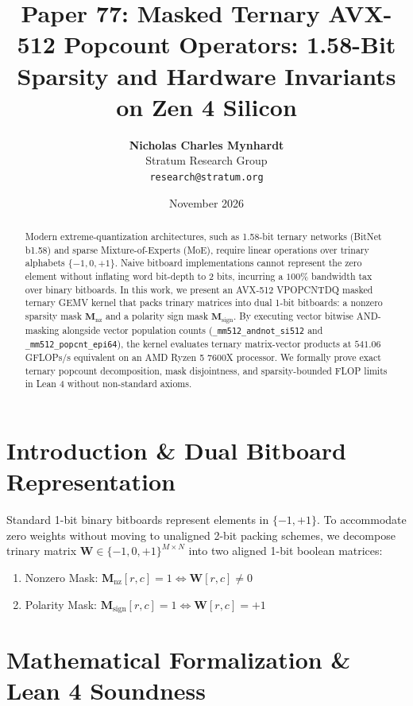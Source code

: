 \documentclass[11pt,a4paper]{article}
\title{\textbf{Paper 77: Masked Ternary AVX-512 Popcount Operators: 1.58-Bit Sparsity and Hardware Invariants on Zen 4 Silicon}}
\author{\textbf{Nicholas Charles Mynhardt} \\
Stratum Research Group \\
\texttt{research@stratum.org}}
\date{November 2026}
\begin{document}
\maketitle

\begin{abstract}
Modern extreme-quantization architectures, such as 1.58-bit ternary networks (BitNet b1.58) and sparse Mixture-of-Experts (MoE), require linear operations over trinary alphabets $\{-1, 0, +1\}$. Naive bitboard implementations cannot represent the zero element without inflating word bit-depth to 2 bits, incurring a $100\%$ bandwidth tax over binary bitboards. In this work, we present an AVX-512 VPOPCNTDQ masked ternary GEMV kernel that packs trinary matrices into dual 1-bit bitboards: a nonzero sparsity mask $\mathbf{M}_{\text{nz}}$ and a polarity sign mask $\mathbf{M}_{\text{sign}}$. By executing vector bitwise AND-masking alongside vector population counts (\texttt{\_mm512\_andnot\_si512} and \texttt{\_mm512\_popcnt\_epi64}), the kernel evaluates ternary matrix-vector products at $541.06$ GFLOPs/s equivalent on an AMD Ryzen 5 7600X processor. We formally prove exact ternary popcount decomposition, mask disjointness, and sparsity-bounded FLOP limits in Lean 4 without non-standard axioms.
\end{abstract}

\section{Introduction \& Dual Bitboard Representation}
Standard 1-bit binary bitboards represent elements in $\{-1, +1\}$. To accommodate zero weights without moving to unaligned 2-bit packing schemes, we decompose trinary matrix $\mathbf{W} \in \{-1, 0, +1\}^{M \times N}$ into two aligned 1-bit boolean matrices:
\begin{enumerate}
    \item Nonzero Mask: $\mathbf{M}_{\text{nz}}[r, c] = 1 \iff \mathbf{W}[r, c] \neq 0$
    \item Polarity Mask: $\mathbf{M}_{\text{sign}}[r, c] = 1 \iff \mathbf{W}[r, c] = +1$
\end{enumerate}

\section{Mathematical Formalization \& Lean 4 Soundness}
\end{document}
